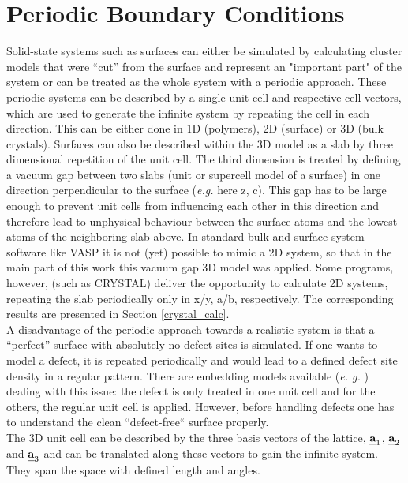 \documentclass[11pt,DIV=13,BCOR=5mm,a4paper,headinclude]{scrbook}
\def\mathbi#1{\textbf{\em #1}}
\renewcommand{\vec}[1]{\mathbi{#1}}
\begin{document}
\section{Periodic Boundary Conditions}
Solid-state systems such as surfaces can either be simulated by calculating cluster models that were ``cut'' from the surface and represent an "important part" of the system or can be treated as the whole system with a periodic approach.
These periodic systems can be described by a single unit cell and respective cell vectors, which are used to generate the infinite system by repeating the cell in each direction.
This can be either done in 1D (polymers), 2D (surface) or 3D (bulk crystals).
Surfaces can also be described within the 3D model as a slab by three dimensional repetition of the unit cell.
The third dimension is treated by defining a vacuum gap between two slabs (unit or supercell model of a surface) in one direction perpendicular to the surface (\textit{e.g.} here z, c).
This gap has to be large enough to prevent unit cells from influencing each other in this direction and therefore lead to unphysical behaviour between the surface atoms and the lowest atoms of the neighboring slab above.
In standard bulk and surface system software like VASP\cite{kresse1993,kresse2,kresse3,kresse4,kresse99} it is not (yet) possible to mimic a 2D system, so that in the main part of this work this vacuum gap 3D model was applied.
Some programs, however, (such as CRYSTAL\cite{crystal14}) %
deliver the opportunity to calculate 2D systems, repeating the slab periodically only in x/y, a/b, respectively.
The corresponding results are presented in Section \ref{crystal_calc}.
\\
A disadvantage of the periodic approach towards a realistic system is that a ``perfect'' surface with absolutely no defect sites is simulated.
If one wants to model a defect, it is repeated periodically and would lead to a defined defect site density in a regular pattern.
There are embedding models available (\textit{e.
g.} \cite{Sauer2004}) dealing with this issue: the defect is only treated in one unit cell and for the others, the regular unit cell is applied.
However, before handling defects one has to understand the clean ``defect-free`` surface properly.
\\
The 3D unit cell can be described by the three basis vectors of the lattice, $\vec{a}_1$, $\vec{a}_2$ and $\vec{a}_3$ and can be translated along these vectors to gain the infinite system.
They span the space with defined length and angles.
\end{document}
